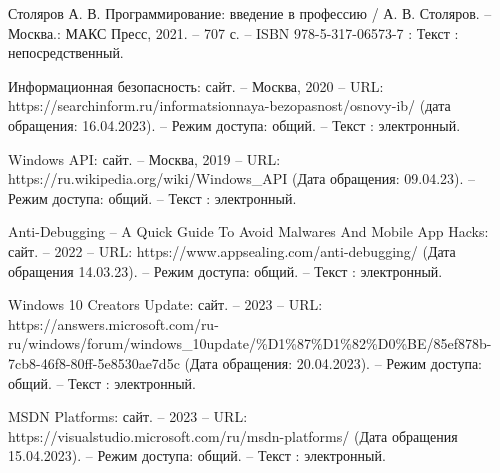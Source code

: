 

\begin{thebibliography}{0}

   Столяров А. В. Программирование: введение в
  профессию / А. В. Столяров. -- Москва.: МАКС Пресс, 2021. -- 707 с. -- ISBN
  978-5-317-06573-7 : Текст : непосредственный. 

   Информационная безопасность: сайт. -- Москва, 2020 -- URL:
  https://searchinform.ru/informatsionnaya-bezopasnost/osnovy-ib/ (дата
  обращения: 16.04.2023). -- Режим доступа: общий. -- Текст : электронный.

   Windows API: сайт. -- Москва, 2019 --  URL:
  https://ru.wikipedia.org/wiki/Windows\_API (Дата обращения: 09.04.23). --
  Режим доступа: общий. -- Текст : электронный.

   Anti-Debugging – A Quick Guide To Avoid Malwares And
  Mobile App Hacks: сайт. -- 2022 -- URL:
  https://www.appsealing.com/anti-debugging/ (Дата обращения 14.03.23). -- Режим
  доступа: общий. -- Текст : электронный.

   Windows 10 Creators Update: сайт. -- 2023 -- URL:
  https://answers.microsoft.com/ru-ru/windows/forum/windows\_10update/\%D1\%87\%D1\%82\%D0\%BE/85ef878b-7cb8-46f8-80ff-5e8530ae7d5c
  (Дата обращения: 20.04.2023). -- Режим доступа: общий. -- Текст : электронный.

   MSDN Platforms: сайт. -- 2023 --  URL:
  https://visualstudio.microsoft.com/ru/msdn-platforms/ (Дата обращения
  15.04.2023). -- Режим доступа: общий. -- Текст : электронный.


\end{thebibliography}
